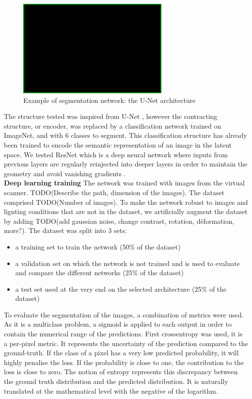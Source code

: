 \begin{figure}[h!]
    \centering
    \includegraphics[scale = 0.25]{figures/blank.png}
    \caption{Example of segmentation network: the U-Net architecture \cite{ronneberger_u-net:_2015}}
    \label{fig:unet}
\end{figure}

  The structure tested was inspired from U-Net \cite{ronneberger_u-net:_2015}, however the contracting structure, or encoder, was replaced by a classification network trained on ImageNet, and with 6 classes to segment. This classification structure has already been trained to encode the semantic representation of an image in the latent space. We tested ResNet \cite{he_deep_2015} which is a deep neural network where inputs from previous layers are regularly reinjected into deeper layers in order to maintain the geometry and avoid vanishing gradients \cite{hochreiter_vanishing_1998}.\\
  

\textbf{Deep learning training}
The network was trained with images from the virtual scanner. TODO(Describe the path, dimension of the images). The dataset comprised TODO(Number of images). To make the network robust to images and lignting conditions that are not in the dataset, we artificially augment the dataset by adding TODO(add gaussian noise, change contrast, rotation, déformation, more?).
The dataset was split into 3 sets:

\begin{itemize}
    \item a training set to train the network (50\% of the dataset)
    \item a validation set on which the network is not trained and is used to evaluate and compare the different networks (25\% of the dataset)
    \item a test set used at the very end on the selected architecture (25\% of the dataset)
\end{itemize}


To evaluate the segmentation of the images, a combination of metrics were used. As it is a multiclass problem, a sigmoid is applied to each output in order to contain the numerical range of the predictions. First crossentropy was used, it is a per-pixel metric. It represents the uncertainty of the prediction compared to the ground-truth. If the class of a pixel has a very low predicted probability, it will highly penalise the loss. If the probability is close to one, the contribution to the loss is close to zero. The notion of entropy represents this discrepancy between the ground truth distribution and the predicted distribution. It is naturally translated at the mathematical level with the negative of the logarithm. 

